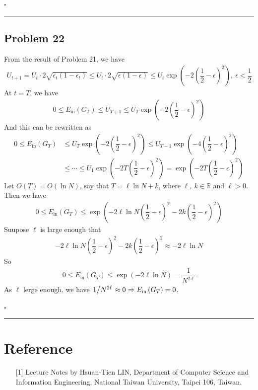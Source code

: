 \documentclass[12pt]{article}
\newcommand*{\QEDB}{\hfill\ensuremath{\square}}
\newcommand{\ParTh}[1]{\left(#1\right)}
\newcommand{\Divide}[2]{\left.#1\middle/#2\right.}
\newcommand{\horrule}[1]{\rule{\linewidth}{#1}}
\begin{document}
\QEDB

\horrule{0.5pt}

\subsection*{Problem 22}

From the result of Problem 21, we have
\begin{align}
U_{t+1}=U_t\cdot2\sqrt{\epsilon_t\ParTh{1-\epsilon_t}}\leq U_t\cdot2\sqrt{\epsilon\ParTh{1-\epsilon}}\leq U_t\exp\ParTh{-2\ParTh{\dfrac{1}{2}-\epsilon}^2},~\epsilon<\dfrac{1}{2}
\end{align}
At $t=T$, we have
\begin{align}
0\leq E_{\text{in}}\ParTh{G_T}\leq U_{T+1}\leq U_T\exp\ParTh{-2\ParTh{\dfrac{1}{2}-\epsilon}^2}
\end{align}
And this can be rewritten as
\begin{align}
0\leq E_{\text{in}}\ParTh{G_T}&\leq U_T\exp\ParTh{-2\ParTh{\dfrac{1}{2}-\epsilon}^2}\leq U_{T-1}\exp\ParTh{-4\ParTh{\dfrac{1}{2}-\epsilon}^2}\\
&\leq\cdots\leq U_1\exp\ParTh{-2T\ParTh{\dfrac{1}{2}-\epsilon}^2}=\exp\ParTh{-2T\ParTh{\dfrac{1}{2}-\epsilon}^2}
\end{align}
Let $O\ParTh{T}=O\ParTh{\ln N}$, say that $T=\ell\ln N+k$, where $\ell,~k\in\mathbb{R}$ and $\ell>0$. Then we have
\begin{align}
0\leq E_{\text{in}}\ParTh{G_T}\leq\exp\ParTh{-2\ell\ln N\ParTh{\dfrac{1}{2}-\epsilon}^2-2k\ParTh{\dfrac{1}{2}-\epsilon}^2}
\end{align}
Suupose $\ell$ is large enough that
\begin{align}
-2\ell\ln N\ParTh{\dfrac{1}{2}-\epsilon}^2-2k\ParTh{\dfrac{1}{2}-\epsilon}^2\approx-2\ell\ln N
\end{align}
So
\begin{align}
0\leq E_{\text{in}}\ParTh{G_T}\leq\exp\ParTh{-2\ell\ln N}=\dfrac{1}{N^{2\ell}}
\end{align}
As $\ell$ lerge enough, we have $\Divide{1}{N^{2\ell}}\approx0\Rightarrow E_{\text{in}}\ParTh{G_T}=0$.

\QEDB

\horrule{0.5pt}

\section*{Reference}

\begin{enumerate}

\item[{[1]}] Lecture Notes by Hsuan-Tien LIN, Department of Computer Science and Information Engineering, National Taiwan University, Taipei 106, Taiwan.

\end{enumerate}
\end{document}
